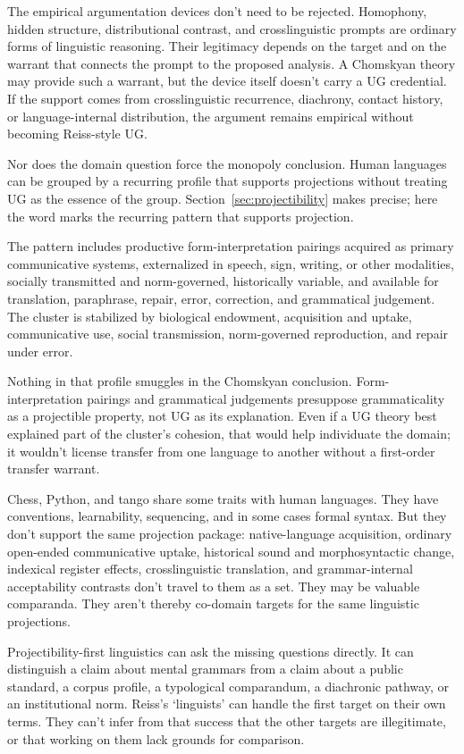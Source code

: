 \documentclass[12pt]{article}
\begin{document}
The empirical argumentation devices don't need to be rejected. Homophony, hidden structure, distributional contrast, and crosslinguistic prompts are ordinary forms of linguistic reasoning. Their legitimacy depends on the target and on the warrant that connects the prompt to the proposed analysis. A Chomskyan theory may provide such a warrant, but the device itself doesn't carry a UG credential. If the support comes from crosslinguistic recurrence, diachrony, contact history, or language-internal distribution, the argument remains empirical without becoming Reiss-style UG.

Nor does the domain question force the monopoly conclusion. Human languages can be grouped by a recurring profile that supports projections without treating UG as the essence of the group. Section~\ref{sec:projectibility} makes  precise; here the word marks the recurring pattern that supports projection.

The pattern includes productive form-interpretation pairings acquired as primary communicative systems, externalized in speech, sign, writing, or other modalities, socially transmitted and norm-governed, historically variable, and available for translation, paraphrase, repair, error, correction, and grammatical judgement. The cluster is stabilized by biological endowment, acquisition and uptake, communicative use, social transmission, norm-governed reproduction, and repair under error.

Nothing in that profile smuggles in the Chomskyan conclusion. Form-interpretation pairings and grammatical judgements presuppose grammaticality as a projectible property, not UG as its explanation. Even if a UG theory best explained part of the cluster's cohesion, that would help individuate the domain; it wouldn't license transfer from one language to another without a first-order transfer warrant.

Chess, Python, and tango share some traits with human languages. They have conventions, learnability, sequencing, and in some cases formal syntax. But they don't support the same projection package: native-language acquisition, ordinary open-ended communicative uptake, historical sound and morphosyntactic change, indexical register effects, crosslinguistic translation, and grammar-internal acceptability contrasts don't travel to them as a set. They may be valuable comparanda. They aren't thereby co-domain targets for the same linguistic projections.

Projectibility-first linguistics can ask the missing questions directly. It can distinguish a claim about mental grammars from a claim about a public standard, a corpus profile, a typological comparandum, a diachronic pathway, or an institutional norm. Reiss's `linguists' can handle the first target on their own terms. They can't infer from that success that the other targets are illegitimate, or that  working on them lack grounds for comparison.
\end{document}
